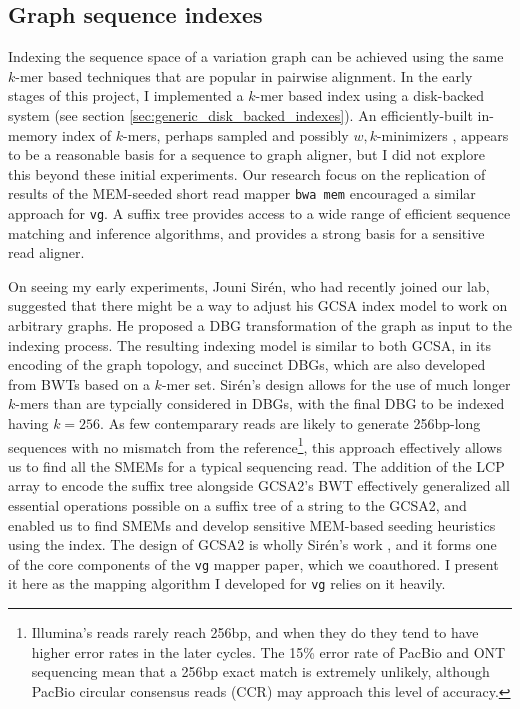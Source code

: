 \subsection{Graph sequence indexes}
\label{sec:graph_sequence_indexes}
Indexing the sequence space of a variation graph can be achieved using the same $k$-mer based techniques that are popular in pairwise alignment.
In the early stages of this project, I implemented a $k$-mer based index using a disk-backed system (see section \ref{sec:generic_disk_backed_indexes}).
An efficiently-built in-memory index of $k$-mers, perhaps sampled and possibly $w,k$-minimizers \cite{marccais2018asymptotically,li2018minimap2}, appears to be a reasonable basis for a sequence to graph aligner, but I did not explore this beyond these initial experiments.
Our research focus on the replication of results of the MEM-seeded short read mapper {\tt bwa mem} encouraged a similar approach for {\tt vg}.
A suffix tree provides access to a wide range of efficient sequence matching and inference algorithms, and provides a strong basis for a sensitive read aligner.

On seeing my early experiments, Jouni Sir\'{e}n, who had recently joined our lab, suggested that there might be a way to adjust his GCSA index model to work on arbitrary graphs.
He proposed a DBG transformation of the graph as input to the indexing process.
The resulting indexing model is similar to both GCSA, in its encoding of the graph topology, and succinct DBGs, which are also developed from BWTs based on a $k$-mer set.
Sir\'{e}n's design allows for the use of much longer $k$-mers than are typcially considered in DBGs, with the final DBG to be indexed having $k=256$.
As few contemparary reads are likely to generate 256bp-long sequences with no mismatch from the reference\footnote{Illumina's reads rarely reach 256bp, and when they do they tend to have higher error rates in the later cycles. The 15\% error rate of PacBio and ONT sequencing mean that a 256bp exact match is extremely unlikely, although PacBio circular consensus reads (CCR) may approach this level of accuracy.}, this approach effectively allows us to find all the SMEMs for a typical sequencing read.
The addition of the LCP array to encode the suffix tree alongside GCSA2's BWT effectively generalized all essential operations possible on a suffix tree of a string to the GCSA2, and enabled us to find SMEMs and develop sensitive MEM-based seeding heuristics using the index.
The design of GCSA2 is wholly Sir\'{e}n's work \cite{siren2017indexing}, and it forms one of the core components of the {\tt vg} mapper paper, which we coauthored.
I present it here as the mapping algorithm I developed for {\tt vg} relies on it heavily.

